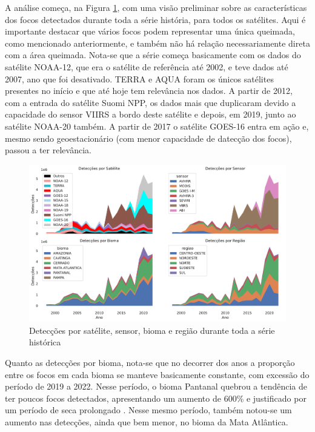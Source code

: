 \documentclass[cic,tc]{iiufrgs}
\begin{document}
A análise começa, na Figura \ref{fig:medicoes_nos_anos}, com uma visão preliminar sobre as características dos focos detectados durante toda a série história, para todos os satélites. Aqui é importante destacar que vários focos podem representar uma única queimada, como mencionado anteriormente, e também não há relação necessariamente direta com a área queimada. Nota-se que a série começa basicamente com os dados do satélite NOAA-12, que era o satélite de referência até 2002, e teve dados até 2007, ano que foi desativado. TERRA e AQUA foram os únicos satélites presentes no início e que até hoje tem relevância nos dados. A partir de 2012, com a entrada do satélite Suomi NPP, os dados mais que duplicaram devido a capacidade do sensor VIIRS a bordo deste satélite e depois, em 2019, junto ao satélite NOAA-20 também. A partir de 2017 o satélite GOES-16 entra em ação e, mesmo sendo geoestacionário (com menor capacidade de datecção dos focos), passou a ter relevância.


\begin{figure}[!htb]
    \caption{Detecções por satélite, sensor, bioma e região durante toda a série histórica}
    \begin{center}
        \includegraphics[width=35em]{medicoes_nos_anos}
    \end{center}
    \label{fig:medicoes_nos_anos}
\end{figure}

Quanto as detecções por bioma, nota-se que no decorrer dos anos a proporção entre os focos em cada bioma se manteve basicamente constante, com excessão do período de 2019 a 2022. Nesse período, o bioma Pantanal quebrou a tendência de ter poucos focos detectados, apresentando um aumento de 600\% e justificado por um período de seca prolongado \cite{pantanal2021dinamica}. Nesse mesmo período, também notou-se um aumento nas detecções, ainda que bem menor, no bioma da Mata Atlântica.
\end{document}
